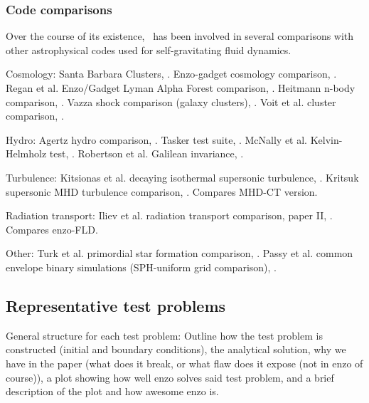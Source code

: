 \subsubsection{Code comparisons}
\label{sec.tests.compare}

Over the course of its existence, \enzo\ has been involved in several
comparisons with other astrophysical codes used for self-gravitating
fluid dynamics.

Cosmology: 
Santa Barbara Clusters, \citep{SantaBarbara}.
Enzo-gadget cosmology comparison, \citep{2005ApJS..160....1O}.
Regan et al. Enzo/Gadget Lyman Alpha Forest comparison,
\citep{2007MNRAS.374..196R}.
Heitmann n-body comparison, \citep{2008CS&D....1a5003H}.
Vazza shock comparison (galaxy clusters), \citep{2011MNRAS.418..960V}.
Voit et al. cluster comparison, \citep{2005MNRAS.364..909V}.

Hydro:
Agertz hydro comparison, \citep{2007MNRAS.380..963A}.
Tasker test suite, \citep{Tasker2008}.
McNally et al. Kelvin-Helmholz test, \citep{2012ApJS..201...18M}.
Robertson et al. Galilean invariance, \citep{2010MNRAS.401.2463R}.

Turbulence:
Kitsionas et al. decaying isothermal supersonic turbulence, \citep{2009A&A...508..541K}.
Kritsuk supersonic MHD turbulence comparison,
\citep{2011ApJ...737...13K}.  Compares MHD-CT version.

Radiation transport:
Iliev et al. radiation transport comparison, paper II, \citep{IlievEtAl2009}.  Compares enzo-FLD.

Other:
Turk et al. primordial star formation comparison, \citep{2011ApJ...726...55T}.  
Passy et al. common envelope binary
simulations (SPH-uniform grid comparison), \citep{2012ApJ...744...52P}.  



\subsection{Representative test problems}
\label{sec.tests.problems}

General structure for each test problem:  Outline how the test problem is constructed (initial and boundary conditions), 
the analytical solution, why we have in the paper (what does it break, or what flaw does it expose (not in enzo of course)),
a plot showing how well enzo solves said test problem, and a brief description of the plot and how awesome enzo is.

